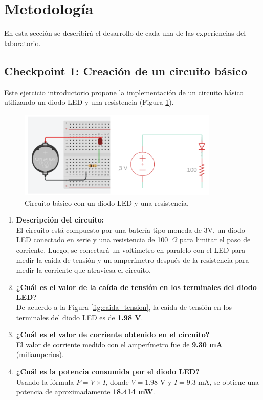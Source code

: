 \documentclass{article}
\begin{document}
\section{Metodolog\'ia}

En esta sección se describir\'a el desarrollo de cada una de las experiencias del laboratorio.

\subsection{Checkpoint 1: Creación de un circuito b\'asico}

Este ejercicio introductorio propone la implementación de un circuito b\'asico utilizando un diodo LED y una resistencia (Figura \ref{fig:circuito_basico}). 

\begin{figure}[H]
    \centering
    \includegraphics[width=0.85\textwidth]{./img/ckpt_1_0.png}
    \caption{Circuito b\'asico con un diodo LED y una resistencia.}
    \label{fig:circuito_basico}
\end{figure}

\begin{enumerate}
    \item \textbf{Descripción del circuito:} \\
    El circuito est\'a compuesto por una bater\'ia tipo moneda de 3V, un diodo LED conectado en serie y una resistencia de 100~$\Omega$ para limitar el paso de corriente. Luego, se conectar\'a un volt\'imetro en paralelo con el LED para medir la ca\'ida de tensión y un amper\'imetro después de la resistencia para medir la corriente que atraviesa el circuito.

    \item \textbf{¿Cu\'al es el valor de la ca\'ida de tensión en los terminales del diodo LED?} \\
    De acuerdo a la Figura \ref{fig:caida_tension}, la ca\'ida de tensión en los terminales del diodo LED es de \textbf{1.98 V}.

    \item \textbf{¿Cu\'al es el valor de corriente obtenido en el circuito?} \\
    El valor de corriente medido con el amper\'imetro fue de \textbf{9.30 mA} (miliamperios).

    \item \textbf{¿Cu\'al es la potencia consumida por el diodo LED?} \\
    Usando la fórmula $P = V \times I$, donde $V = 1.98$ V y $I = 9.3$ mA, se obtiene una potencia de aproximadamente \textbf{18.414 mW}.
\end{enumerate}
\end{document}
